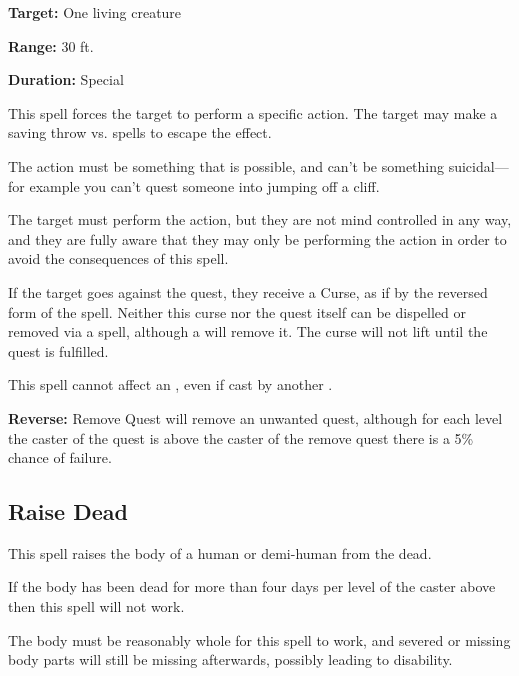 \begin{multicols*}{2}
{\textbf{Target:} One living creature

\textbf{Range:} 30 ft.

\textbf{Duration:} Special}

This spell forces the target to perform a specific action. The target may make a saving throw vs. spells to escape the effect.

The action must be something that is possible, and can’t be something suicidal—for example you can’t quest someone into jumping off a cliff.

The target must perform the action, but they are not mind controlled in any way, and they are fully aware that they may only be performing the action in order to avoid the consequences of this spell.

If the target goes against the quest, they receive a Curse, as if by the reversed form of the  spell. Neither this curse nor the quest itself can be dispelled or removed via a  spell, although a  will remove it. The curse will not lift until the quest is fulfilled.

This spell cannot affect an , even if cast by another .

\textbf{Reverse:} \hypertarget{spell:Remove Quest}{Remove Quest} will remove an unwanted quest, although for each level the caster of the quest is above the caster of the remove quest there is a 5\% chance of failure.

\subsection{Raise Dead}\label{spell:Raise Dead}

This spell raises the body of a human or demi-human from the dead.

If the body has been dead for more than four days per level of the caster above  then this spell will not work.

The body must be reasonably whole for this spell to work, and severed or missing body parts will still be missing afterwards, possibly leading to disability.


\end{multicols*}
